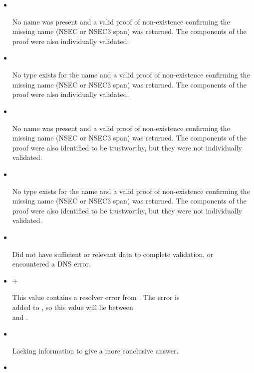\begin{description}
\begin{description}
\begin{itemize}
\item {}\verb" "

No name was present and a valid proof of non-existence confirming the missing
name (NSEC or NSEC3 span) was returned. The components of the proof were also
individually validated.

\item {}\verb" "

No type exists for the name and a valid proof of non-existence confirming the
missing name (NSEC or NSEC3 span) was returned.  The components of the proof
were also individually validated.

\item {}\verb" "

No name was present and a valid proof of non-existence confirming the missing
name (NSEC or NSEC3 span) was returned. The components of the proof were also
identified to be trustworthy, but they were not individually validated.

\item {}\verb" "

No type exists for the name and a valid proof of non-existence confirming the
missing name (NSEC or NSEC3 span) was returned.  The components of the proof
were also identified to be trustworthy, but they were not individually
validated.

\item {}\verb" "

Did not have sufficient or relevant data to complete validation, or
encountered a DNS error.

\item {} $+$ \verb" "

This value contains a resolver error from .  The 
error is \\
added to , so this value will lie between \\
 and .

\item {}\verb" "

Lacking information to give a more conclusive answer.

\item {}\verb" "


\end{itemize}
\end{description}
\end{description}
